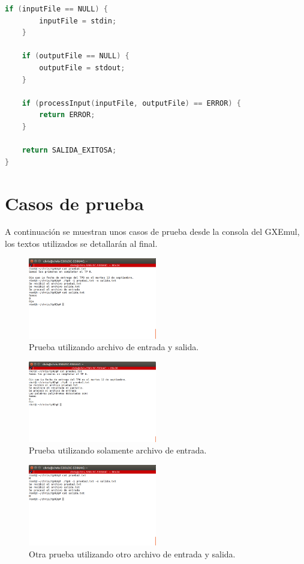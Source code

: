 \documentclass[a4paper]{article}
\begin{document}
\begin{lstlisting}[language=C]
    if (inputFile == NULL) {
        inputFile = stdin;
    }

    if (outputFile == NULL) {
        outputFile = stdout;
    }

    if (processInput(inputFile, outputFile) == ERROR) {
        return ERROR;
    }

    return SALIDA_EXITOSA;
}
\end{lstlisting}

\section{Casos de prueba}

A continuación se muestran unos casos de prueba desde la consola del GXEmul, los textos utilizados se detallarán al final.


\begin{figure}[!htp]
\begin{center}
\includegraphics[width=0.5\textwidth]{prueba1.png}
\caption{Prueba utilizando archivo de entrada y salida.} \label{fig001}
\end{center}
\end{figure}

\begin{figure}[!htp]
\begin{center}
\includegraphics[width=0.5\textwidth]{prueba1SalidaPorPantalla.png}
\caption{Prueba utilizando solamente archivo de entrada.} \label{fig001}
\end{center}
\end{figure}

\begin{figure}[!htp]
\begin{center}
\includegraphics[width=0.5\textwidth]{prueba2.png}
\caption{Otra prueba utilizando otro archivo de entrada y salida.} \label{fig001}
\end{center}
\end{figure}
\end{document}
